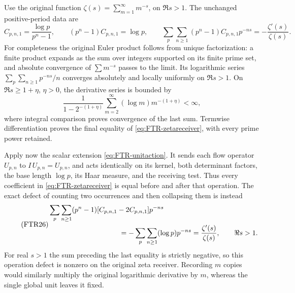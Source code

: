 Use the original function
$\zeta(s)=\sum_{m=1}^\infty m^{-s}$, on $\Re s>1$.
The unchanged positive-period data are
\begin{equation}\tag{FTR25}\label{eq:FTR-zetareceiver}
 C_{p,n,1}=\frac{\log p}{p^n-1},\qquad
 (p^n-1)C_{p,n,1}=\log p,\qquad
 \sum_p\sum_{n\geq1}(p^n-1)C_{p,n,1}p^{-ns}
        =-\frac{\zeta'(s)}{\zeta(s)}.
\end{equation}
For completeness the original Euler product follows from unique
factorization: a finite product expands as the sum over integers
supported on its finite prime set, and absolute convergence of
$\sum m^{-s}$ passes to the limit. Its logarithmic series
$\sum_p\sum_{n\geq1}p^{-ns}/n$ converges absolutely and locally
uniformly on $\Re s>1$. On $\Re s\geq1+\eta$, $\eta>0$,
the derivative series is bounded by
\[
 \frac1{1-2^{-(1+\eta)}}
         \sum_{m=2}^\infty(\log m)m^{-(1+\eta)}<\infty,
\]
where integral comparison proves convergence of the last sum.
Termwise differentiation proves the final equality of
\eqref{eq:FTR-zetareceiver}, with every prime power retained.

Apply now the scalar extension \eqref{eq:FTR-unitaction}.
It sends each flow operator $U_{p,n}$ to
$I\,U_{p,n}=U_{p,n}$, and acts identically on its kernel,
both determinant factors, the base length $\log p$, its Haar
measure, and the receiving test. Thus every coefficient in
\eqref{eq:FTR-zetareceiver} is equal before and after that
operation. The exact defect of counting two occurrences and
then collapsing them is instead
\begin{equation}\tag{FTR26}\label{eq:FTR-zetadefect}
 \begin{aligned}
 &\sum_p\sum_{n\geq1}(p^n-1)
       [C_{p,n,1}-2C_{p,n,1}]p^{-ns}\\
 &\hspace{35mm}=-\sum_p\sum_{n\geq1}(\log p)p^{-ns}
       =\frac{\zeta'(s)}{\zeta(s)},\qquad\Re s>1.
 \end{aligned}
\end{equation}
For real $s>1$ the sum preceding the last equality is strictly
negative, so this operation defect is nonzero on the original
zeta receiver. Recording $m$ copies would similarly multiply
the original logarithmic derivative by $m$, whereas the single
global unit leaves it fixed.

